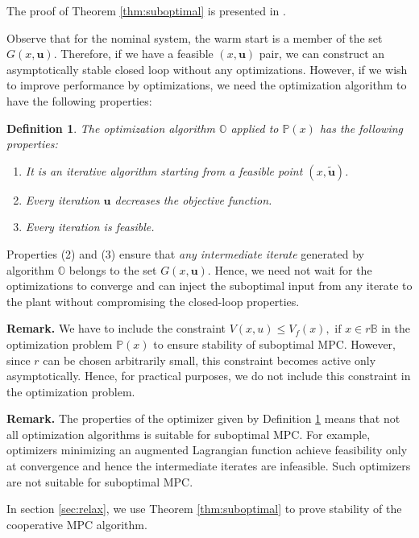 \documentclass[10pt, twocolumn]{article}
\newcommand{\bu}{\mathbf{u}}
\newtheorem{definition}{Definition}
\theoremstyle{definition}
\begin{document}
The proof of Theorem \ref{thm:suboptimal} is presented in \citep{pannocchia:rawlings:wright:2011}.

Observe that for the nominal system, the warm start is a member of the set $G(x,\bu)$. Therefore, if we have a feasible $(x,\bu)$ pair, we can construct an asymptotically stable closed loop without any optimizations. However, if we wish to improve performance by optimizations, we need the optimization algorithm to have the following properties:
\begin{definition}
\label{thm:propO}
The optimization algorithm $\mathbb{O}$ applied to $\mathbb{P}(x)$ has the following properties:
\begin{enumerate}
\item It is an iterative algorithm starting from a feasible point $(x,\tilde{\bu})$.
\item Every iteration $\bu$ decreases the objective function. 
\item Every iteration is feasible.
\end{enumerate}
\end{definition}
Properties (2) and (3) ensure that {\em{any intermediate iterate}} generated by algorithm $\mathbb{O}$ belongs to the set $G(x,\bu)$. Hence, we need not  wait for the optimizations to converge and can inject the suboptimal input from any iterate to the plant without compromising the closed-loop properties.

\textbf{Remark.} We have to include the constraint $V(x,u) \leq V_f(x), \text{~if~} x \in r\mathbb{B}$ in the optimization problem $\mathbb{P}(x)$ to ensure stability of suboptimal MPC. However, since $r$ can be chosen arbitrarily small, this constraint becomes active only asymptotically. Hence, for practical purposes, we do not include this constraint in the optimization problem.


\textbf{Remark.} The properties of the optimizer given by Definition \ref{thm:propO} means that not all optimization algorithms is suitable for suboptimal MPC. For example, optimizers minimizing an augmented Lagrangian function achieve feasibility only at convergence and hence the intermediate iterates are infeasible. Such optimizers are not suitable for suboptimal MPC. 

In section \ref{sec:relax}, we use Theorem \ref{thm:suboptimal} to prove stability of the cooperative MPC algorithm.
\end{document}
